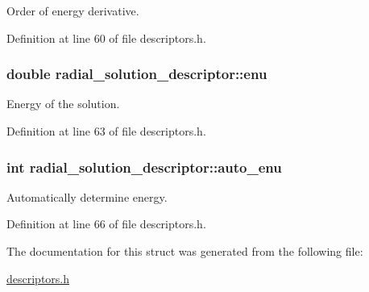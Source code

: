 Order of energy derivative. 



Definition at line 60 of file descriptors.\+h.

\hypertarget{structradial__solution__descriptor_afa0bfaee751cd2b7e8c2e9ab001118c0}{}
\subsubsection[{enu}]{\setlength{\rightskip}{0pt plus 5cm}double radial\+\_\+solution\+\_\+descriptor\+::enu}\label{structradial__solution__descriptor_afa0bfaee751cd2b7e8c2e9ab001118c0}


Energy of the solution. 



Definition at line 63 of file descriptors.\+h.

\hypertarget{structradial__solution__descriptor_a4efb2665e4ab177682b288e992018526}{}
\subsubsection[{auto\+\_\+enu}]{\setlength{\rightskip}{0pt plus 5cm}int radial\+\_\+solution\+\_\+descriptor\+::auto\+\_\+enu}\label{structradial__solution__descriptor_a4efb2665e4ab177682b288e992018526}


Automatically determine energy. 



Definition at line 66 of file descriptors.\+h.



The documentation for this struct was generated from the following file\+:\begin{DoxyCompactItemize}
\item 
\hyperlink{descriptors_8h}{descriptors.\+h}\end{DoxyCompactItemize}
